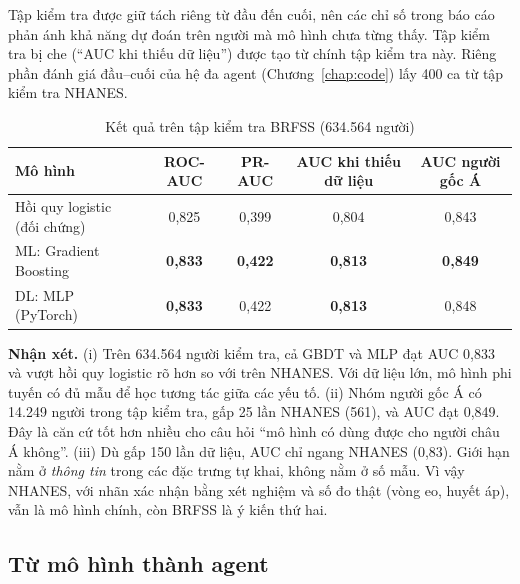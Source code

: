 Tập kiểm tra được giữ tách riêng từ đầu đến cuối, nên các chỉ số trong báo cáo phản ánh khả năng dự đoán trên người mà mô hình chưa từng thấy. Tập kiểm tra bị che (``AUC khi thiếu dữ liệu'') được tạo từ chính tập kiểm tra này. Riêng phần đánh giá đầu–cuối của hệ đa agent (Chương~\ref{chap:code}) lấy 400 ca từ tập kiểm tra NHANES.

\begin{table}[H]
\centering
\caption{Kết quả trên tập kiểm tra BRFSS (634.564 người)}
\label{tab:brfss-metrics}
\small
\begin{tabular}{@{}lcccc@{}}
\toprule
\textbf{Mô hình} & \textbf{ROC-AUC} & \textbf{PR-AUC} & \textbf{AUC khi thiếu dữ liệu} & \textbf{AUC người gốc Á} \\
\midrule
Hồi quy logistic (đối chứng) & 0,825 & 0,399 & 0,804 & 0,843 \\
ML: Gradient Boosting & \textbf{0,833} & \textbf{0,422} & \textbf{0,813} & \textbf{0,849} \\
DL: MLP (PyTorch) & \textbf{0,833} & 0,422 & \textbf{0,813} & 0,848 \\
\bottomrule
\end{tabular}
\end{table}

\textbf{Nhận xét.} (i) Trên 634.564 người kiểm tra, cả GBDT và MLP đạt AUC 0,833 và vượt hồi quy logistic rõ hơn so với trên NHANES. Với dữ liệu lớn, mô hình phi tuyến có đủ mẫu để học tương tác giữa các yếu tố. (ii) Nhóm người gốc Á có 14.249 người trong tập kiểm tra, gấp 25 lần NHANES (561), và AUC đạt 0,849. Đây là căn cứ tốt hơn nhiều cho câu hỏi ``mô hình có dùng được cho người châu Á không''. (iii) Dù gấp 150 lần dữ liệu, AUC chỉ ngang NHANES (0,83). Giới hạn nằm ở \emph{thông tin} trong các đặc trưng tự khai, không nằm ở số mẫu. Vì vậy NHANES, với nhãn xác nhận bằng xét nghiệm và số đo thật (vòng eo, huyết áp), vẫn là mô hình chính, còn BRFSS là ý kiến thứ hai.

\subsection{Từ mô hình thành agent}

